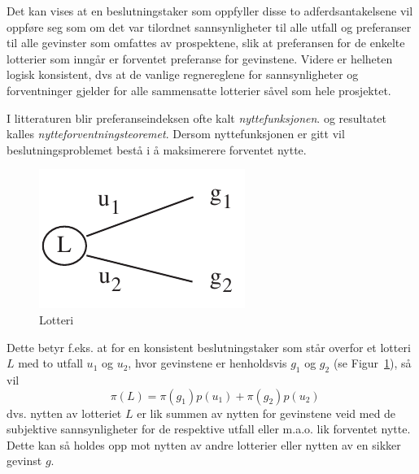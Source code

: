 {{%
Det kan vises at en beslutningstaker som oppfyller
disse to adferdsantakelsene vil oppføre seg som om det var tilordnet
sannsynligheter til  alle utfall og preferanser til  alle gevinster
som omfattes av prospektene, slik at preferansen for
de enkelte lotterier som inngår er forventet preferanse for gevinstene.
Videre er helheten logisk konsistent, dvs at de vanlige 
regne\-reglene for sannsynligheter og forventninger gjelder for alle
sammensatte lotterier såvel som hele prosjektet. 

I litteraturen blir prefe\-ranse\-indeksen ofte kalt {\em nyttefunksjonen}.
og resultatet kalles {\em nytteforventningsteoremet}.
Dersom nyttefunksjonen er gitt vil beslutningsproblemet bestå i å
maksimerere forventet nytte.

\begin{figure}[ht]
\centering
	\includegraphics[scale=1.0]{figurer/fig16_8.pdf} 
\caption{Lotteri}
	\label{fig:lotteri4}
\end{figure}
Dette betyr f.eks. at for en konsistent beslutningstaker som står
overfor et lotteri $L$ med to utfall $u_1$ og $u_2$, hvor gevinstene er
henholdsvis $g_1$ og $g_2$ (se Figur~\ref{fig:lotteri4}), så vil
\[  \mbox{\ \ \ } \pi (L)=\pi (g_1)p(u_1) + \pi (g_2)p(u_2)     \]
dvs. nytten av lotteriet $L$ er lik summen av 
nytten for gevinstene veid med de subjektive sannsynligheter
for de respektive utfall eller m.a.o. lik forventet nytte.
Dette kan så holdes opp mot nytten av andre lotterier eller nytten av
en sikker gevinst $g$.

}}
